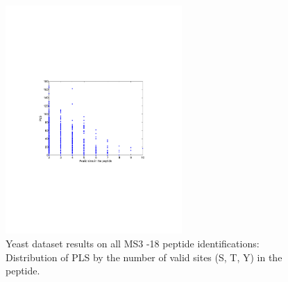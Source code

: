 \begin{figure}[htbp]
\centering %
\includegraphics[trim = 0mm 90mm 20mm 90mm,clip,width=0.6\textwidth]{fig/phospho/allIds/PLS_figs/allIds_PLS_by_num_valid_sites.pdf}
\caption{Yeast dataset results on all MS3 -18 peptide identifications: Distribution of PLS by the number of valid sites (S, T, Y) in the peptide.}
\label{fig:yeast_pls}
\end{figure}


